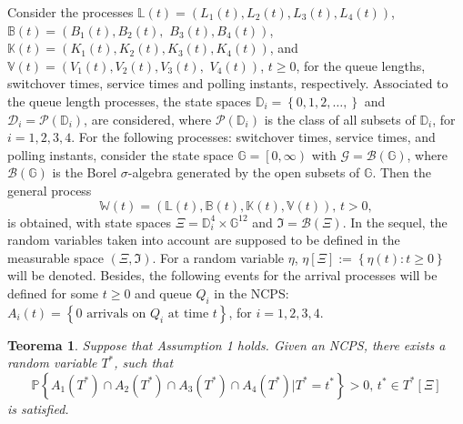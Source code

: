 \documentclass{article}
\newtheorem{Teo}{Teorema}
\newcommand{\prob}{\mathbb{P}}
\begin{document}
Consider the processes  $\mathbb{L}\left(t\right)=\left(L_{1}\left(t\right),L_{2}\left(t\right),L_{3}\left(t\right),L_{4}\left(t\right)\right)$, $\mathbb{B}\left(t\right)=\left(B_{1}\left(t\right),B_{2}\left(t\right),\right.$ $\left.B_{3}\left(t\right),B_{4}\left(t\right)\right)$, $\mathbb{K}\left(t\right)=\left(K_{1}\left(t\right),K_{2}\left(t\right),K_{3}\left(t\right),K_{4}\left(t\right)\right)$, and $\mathbb{V}\left(t\right)=\left(V_{1}\left(t\right),V_{2}\left(t\right),V_{3}\left(t\right),\right.$ $\left.V_{4}\left(t\right)\right)$, $t\geq0$, for the queue lengths, switchover times, service times and polling instants, respectively. Associated to  the queue length processes, the state spaces $\mathbb{D}_{i}=\left\{0,1,2,\ldots,\right\}$ and $\mathcal{D}_{i}=\mathcal{P}\left(\mathbb{D}_{i}\right)$, are considered, where $\mathcal{P}\left(\mathbb{D}_{i}\right)$ is the class of all subsets of $\mathbb{D}_{i}$, for $i=1,2,3,4$. For the following processes: switchover times, service times, and polling instants, consider the state space $\mathbb{G}=\left[0,\infty\right)$ with $\mathcal{G}=\mathcal{B}\left(\mathbb{G}\right)$, where $\mathcal{B}\left(\mathbb{G}\right)$ is the Borel $\sigma$-algebra generated by the open subsets of $\mathbb{G}$. Then the general process $$\mathbb{W}\left(t\right)=\left(\mathbb{L}\left(t\right),\mathbb{B}\left(t\right),\mathbb{K}\left(t\right),\mathbb{V}\left(t\right)\right)\textrm{,  }t>0,$$ is obtained, with state spaces $\Xi=\mathbb{D}_{i}^{4}\times \mathbb{G}^{12}$ and $\Im=\mathcal{B}\left(\Xi\right)$. In the sequel, the random variables taken into account are supposed to be defined in the measurable space $\left(\Xi,\Im\right)$. For a random variable $\eta$, $\eta\left[\Xi\right]:=\left\{\eta\left(t\right):t\geq0\right\}$ will be denoted. Besides, the following events for the arrival processes will be defined for some $t\geq0$ and queue $Q_{i}$ in the NCPS:  $A_{i}\left(t\right)=\left\{0 \textrm{ arrivals on }Q_{i}\textrm{ at time }t\right\}$,  for $i=1,2,3,4$.\medskip
\begin{Teo}\label{First.Regeneration.Time.Theorem}
Suppose that Assumption 1 holds. Given an NCPS, there exists a random variable $T^{*}$, such that $$\prob\left\{A_{1}\left(T^{*}\right)\cap A_{2}\left(T^{*}\right)\cap
A_{3}\left(T^{*}\right)\cap A_{4}\left(T^{*}\right)|T^{*}=t^{*}\right\}>0\textrm{, }t^{*}\in T^{*}\left[\Xi\right]$$  is satisfied.
\end{Teo}
\end{document}
